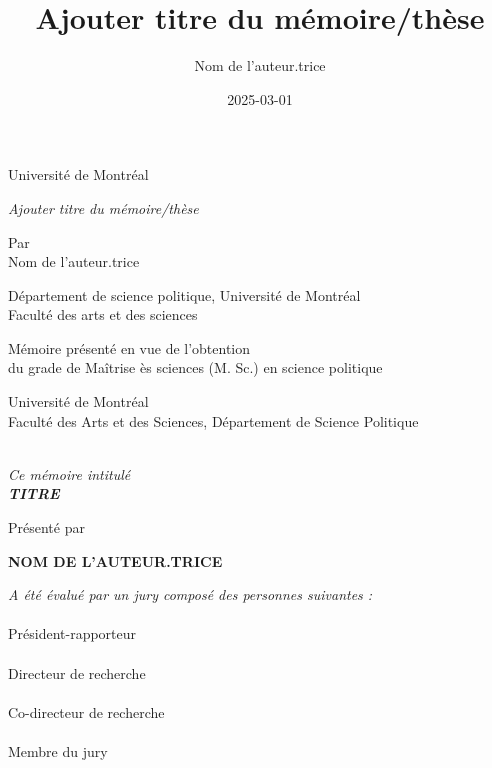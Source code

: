 \documentclass[
  12pt,
  letterpaper,
]{report}
\title{Ajouter titre du mémoire/thèse}
\author{Nom de l'auteur.trice}
\date{2025-03-01}
\begin{document}
\cleardoublepage
\thispagestyle{empty}
{\centering
Université de Montréal \\[2.5cm]
{\itshape Ajouter titre du mémoire/thèse \par}
\vspace{2.5cm}
{Par \\ Nom de l'auteur.trice \par} %
\vspace{2.5cm}
{Département de science politique, Université de Montréal \\ 
Faculté des arts et des sciences \par}
\vspace{2.5cm}
{Mémoire présenté en vue de l'obtention \\ 
du grade de Maîtrise ès sciences (M. Sc.) en science politique \par}
\vspace{2.5cm}
{ \par} %
\vspace{2.5cm}
{\textcopyright{} } %
\clearpage
}
{\centering
Université de Montréal \\
Faculté des Arts et des Sciences, Département de Science Politique \\
\hrulefill \\[2.5cm]
{\itshape Ce mémoire intitulé \\
\textbf{ TITRE } \par}  %
\vspace{2.5cm}
Présenté par \\
{\textbf{NOM DE L'AUTEUR.TRICE} \par}  %
\vspace{2.5cm}
{\itshape A été évalué par un jury composé des personnes suivantes :} \\[1cm]
{\textbf{ }} \\ Président-rapporteur \\[1cm] %
{\textbf{ }} \\ Directeur de recherche \\[1cm] %
{\textbf{ }} \\ Co-directeur de recherche \\[1cm] %
{\textbf{ }} \\ Membre du jury \\ %
}
\cleardoublepage
\thispagestyle{plain}
\end{document}
